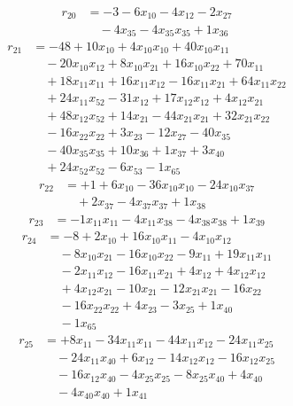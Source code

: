 \[\begin{aligned}
r_{20} &= - 3 - 6 x_{10} - 4 x_{12} - 2 x_{27} \\
 &\quad - 4 x_{35} - 4 x_{35} x_{35} + 1 x_{36}
\end{aligned}\]
\[\begin{aligned}
r_{21} &= - 48 + 10 x_{10} + 4 x_{10} x_{10} + 40 x_{10} x_{11} \\
 &\quad - 20 x_{10} x_{12} + 8 x_{10} x_{21} + 16 x_{10} x_{22} + 70 x_{11} \\
 &\quad + 18 x_{11} x_{11} + 16 x_{11} x_{12} - 16 x_{11} x_{21} + 64 x_{11} x_{22} \\
 &\quad + 24 x_{11} x_{52} - 31 x_{12} + 17 x_{12} x_{12} + 4 x_{12} x_{21} \\
 &\quad + 48 x_{12} x_{52} + 14 x_{21} - 44 x_{21} x_{21} + 32 x_{21} x_{22} \\
 &\quad - 16 x_{22} x_{22} + 3 x_{23} - 12 x_{27} - 40 x_{35} \\
 &\quad - 40 x_{35} x_{35} + 10 x_{36} + 1 x_{37} + 3 x_{40} \\
 &\quad + 24 x_{52} x_{52} - 6 x_{53} - 1 x_{65}
\end{aligned}\]
\[\begin{aligned}
r_{22} &= + 1 + 6 x_{10} - 36 x_{10} x_{10} - 24 x_{10} x_{37} \\
 &\quad + 2 x_{37} - 4 x_{37} x_{37} + 1 x_{38}
\end{aligned}\]
\[\begin{aligned}
r_{23} &= - 1 x_{11} x_{11} - 4 x_{11} x_{38} - 4 x_{38} x_{38} + 1 x_{39}
\end{aligned}\]
\[\begin{aligned}
r_{24} &= - 8 + 2 x_{10} + 16 x_{10} x_{11} - 4 x_{10} x_{12} \\
 &\quad - 8 x_{10} x_{21} - 16 x_{10} x_{22} - 9 x_{11} + 19 x_{11} x_{11} \\
 &\quad - 2 x_{11} x_{12} - 16 x_{11} x_{21} + 4 x_{12} + 4 x_{12} x_{12} \\
 &\quad + 4 x_{12} x_{21} - 10 x_{21} - 12 x_{21} x_{21} - 16 x_{22} \\
 &\quad - 16 x_{22} x_{22} + 4 x_{23} - 3 x_{25} + 1 x_{40} \\
 &\quad - 1 x_{65}
\end{aligned}\]
\[\begin{aligned}
r_{25} &= + 8 x_{11} - 34 x_{11} x_{11} - 44 x_{11} x_{12} - 24 x_{11} x_{25} \\
 &\quad - 24 x_{11} x_{40} + 6 x_{12} - 14 x_{12} x_{12} - 16 x_{12} x_{25} \\
 &\quad - 16 x_{12} x_{40} - 4 x_{25} x_{25} - 8 x_{25} x_{40} + 4 x_{40} \\
 &\quad - 4 x_{40} x_{40} + 1 x_{41}
\end{aligned}\]
